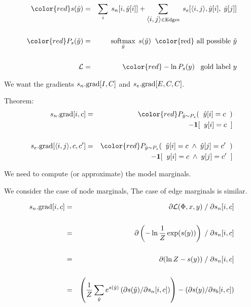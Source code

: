 {\vfill
\begin{eqnarray*}
{\color{red} s(\hat{y})} & = & \sum_i\;s_n[i,\hat{y}[i]] + \sum_{\tuple{i,j} \in \mathrm{Edges}}\;s_e[\tuple{i,j},\hat{y}[i],\;\hat{y}[j]] \\
\\
{\color{red} P_s(\hat{y})} & = & \softmax_{\hat{y}}\;s(\hat{y}) \;\;\mbox{\color{red} all possible $\hat{y}$} \\
\\
{\cal L} & = & {\color{red} - \ln P_s(y) \;\;\;\mbox{gold label $y$}}
\end{eqnarray*}

\vfill
We want the gradients {\color{red} $s_n.\mathrm{grad}[I,C]$} and {\color{red} $s_e.\mathrm{grad}[E,C,C]$}.



Theorem:
\begin{eqnarray*}
    s_n.\mathrm{grad}[i,c] & = &  {\color{red} P_{\hat{y} \sim P_s}(\;\;\hat{y}[i] = c\;\;)} \\
    & & \;\;\;\;\;- \bbone[\;\;y[i] = c\;\;] \\
    \\
    s_e.\mathrm{grad}[\tuple{i,j},c,c'] & = &  {\color{red} P_{\hat{y} \sim P_s}(\;\;\hat{y}[i] = c \; \wedge \; \hat{y}[j] = c'\;\;)} \\
    & & \;\;\;\;\;- \bbone[\;\;y[i] = c\; \wedge \; y[j] = c'\;\;]
\end{eqnarray*}

\vfill
We need to compute (or approximate) the model marginals.


We consider the case of node marginals, The case of edge marginals is similar.

\begin{eqnarray*}
    s_n.\mathrm{grad}[i,c] & = & \partial {\cal L}(\Phi,x,y)\;/\;\partial s_n[i,c] \\
    \\
    & = & \partial \left(-\ln \frac{1}{Z}\exp(s(y))\right)\;/\;\partial s_n[i,c] \\
    \\
    & = & \partial (\ln Z - s(y))\;/\;\partial s_n[i,c] \\
    \\
    & = & \left(\frac{1}{Z} \sum_{\hat{y}} e^{s(\hat{y})} \left(\partial s(\hat{y})/\partial s_n[i,c]\right)\right)
    - \left(\partial s(y) /\partial s_b[i,c]\right) 
\end{eqnarray*}

}
